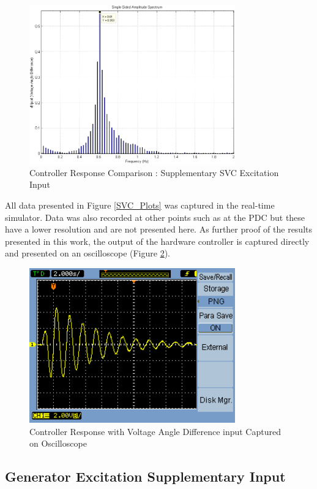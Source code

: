 \documentclass[journal]{IEEEtran}
\begin{document}
\begin{figure}[!th]
\centering
\includegraphics[width=3.5in]{VoltageAngleDiff.png}
\caption{Controller Response Comparison : Supplementary SVC Excitation Input}
\label{FourierAngle}
\end{figure}

All data presented in Figure \ref{SVC_Plots} was captured in the real-time simulator. Data was also recorded at other points such as at the PDC but these have a lower resolution and are not presented here. As further proof of the results presented in this work, the output of the hardware controller is captured directly and presented on an oscilloscope (Figure \ref{ScopeCapture}).

\begin{figure}[!th]
\centering
\includegraphics[width=3.5in]{Best_sample.png}
\caption{Controller Response with Voltage Angle Difference input Captured on Oscilloscope}
\label{ScopeCapture}
\end{figure}

\subsection{Generator Excitation Supplementary Input}
\end{document}
